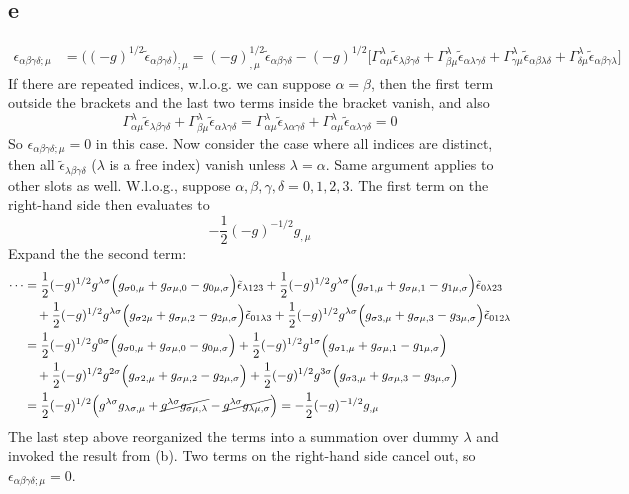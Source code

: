 \documentclass{article}
\begin{document}
\subsection*{e}
\begin{align*}
\epsilon_{\alpha\beta\gamma\delta;\mu} &= \Big((-g)^{1/2}\tilde{\epsilon}_{\alpha\beta\gamma\delta}\Big)_{;\mu}
	=(-g)^{1/2}_{,\mu}\tilde{\epsilon}_{\alpha\beta\gamma\delta} 
	- (-g)^{1/2}\Big[\Gamma_{\alpha\mu}^{\lambda} \tilde{\epsilon}_{\lambda\beta\gamma\delta}
	+ \Gamma_{\beta\mu}^{\lambda} \tilde{\epsilon}_{\alpha\lambda\gamma\delta}
	+ \Gamma_{\gamma\mu}^{\lambda} \tilde{\epsilon}_{\alpha\beta\lambda\delta}
	+ \Gamma_{\delta\mu}^{\lambda} \tilde{\epsilon}_{\alpha\beta\gamma\lambda}\Big]
\end{align*}
If there are repeated indices, w.l.o.g. we can suppose $\alpha = \beta$, then the first term outside the brackets and the last two terms inside the bracket vanish, and also
\[ \Gamma_{\alpha\mu}^{\lambda} \tilde{\epsilon}_{\lambda\beta\gamma\delta}
	+ \Gamma_{\beta\mu}^{\lambda} \tilde{\epsilon}_{\alpha\lambda\gamma\delta} 
= \Gamma_{\alpha\mu}^{\lambda} \tilde{\epsilon}_{\lambda\alpha\gamma\delta}
	+ \Gamma_{\alpha\mu}^{\lambda} \tilde{\epsilon}_{\alpha\lambda\gamma\delta} = 0 \]
So $\epsilon_{\alpha\beta\gamma\delta;\mu} = 0$ in this case. Now consider the case where all indices are distinct, then all
$\tilde{\epsilon}_{\lambda\beta\gamma\delta}$ ($\lambda$ is a free index) vanish unless $\lambda = \alpha$.
Same argument applies to other slots as well. W.l.o.g., suppose $\alpha,\beta,\gamma,\delta = 0,1,2,3$. The first term on the right-hand side then evaluates to
\[ -\frac{1}{2}(-g)^{-1/2}g_{,\mu} \]
Expand the the second term:
\begin{align*}
	\cdots &= \frac{1}{2}(-g)^{1/2}g^{\lambda\sigma} \Big(g_{\sigma0,\mu}+ g_{\sigma\mu,0} - g_{0\mu,\sigma}\Big) \tilde{\epsilon}_{\lambda123} + \frac{1}{2}(-g)^{1/2}g^{\lambda\sigma} \Big(g_{\sigma1,\mu}+ g_{\sigma\mu,1} - g_{1\mu,\sigma}\Big) \tilde{\epsilon}_{0\lambda23}\\
	&\quad+ \frac{1}{2}(-g)^{1/2}g^{\lambda\sigma} \Big(g_{\sigma2\mu}+ g_{\sigma\mu,2} - g_{2\mu,\sigma}\Big) \tilde{\epsilon}_{01\lambda3} + \frac{1}{2}(-g)^{1/2}g^{\lambda\sigma} \Big(g_{\sigma3,\mu}+ g_{\sigma\mu,3} - g_{3\mu,\sigma}\Big) \tilde{\epsilon}_{012\lambda}\\
	&= \frac{1}{2}(-g)^{1/2}g^{0\sigma} \Big(g_{\sigma0,\mu}+ g_{\sigma\mu,0} - g_{0\mu,\sigma}\Big) + \frac{1}{2}(-g)^{1/2}g^{1\sigma} \Big(g_{\sigma1,\mu}+ g_{\sigma\mu,1} - g_{1\mu,\sigma}\Big) \\
	&\quad+ \frac{1}{2}(-g)^{1/2}g^{2\sigma} \Big(g_{\sigma2,\mu}+ g_{\sigma\mu,2} - g_{2\mu,\sigma}\Big) + \frac{1}{2}(-g)^{1/2}g^{3\sigma} \Big(g_{\sigma3,\mu}+ g_{\sigma\mu,3} - g_{3\mu,\sigma}\Big)\\
	&= \frac{1}{2} (-g)^{1/2} \Big( g^{\lambda\sigma}g_{\lambda\sigma,\mu} +\cancel{g^{\lambda\sigma}g_{\sigma\mu,\lambda}} - \cancel{g^{\lambda\sigma}g_{\lambda\mu,\sigma}}\Big) = - \frac{1}{2}(-g)^{-1/2}g_{,\mu}
\end{align*}
The last step above reorganized the terms into a summation over dummy $\lambda$ and invoked the result from (b). Two terms on the right-hand side cancel out, so $\epsilon_{\alpha\beta\gamma\delta;\mu}  = 0$.
\end{document}
